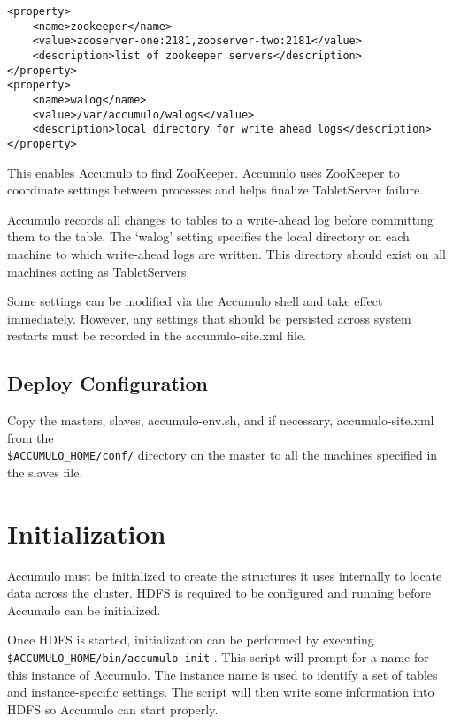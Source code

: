 \small
\begin{verbatim}
<property>
    <name>zookeeper</name>
    <value>zooserver-one:2181,zooserver-two:2181</value>
    <description>list of zookeeper servers</description>
</property>
<property>
    <name>walog</name>
    <value>/var/accumulo/walogs</value>
    <description>local directory for write ahead logs</description>
</property>
\end{verbatim}
\normalsize

This enables Accumulo to find ZooKeeper. Accumulo uses ZooKeeper to coordinate
settings between processes and helps finalize TabletServer failure.

Accumulo records all changes to tables to a write-ahead log before committing
them to the table. The `walog' setting specifies the local directory on each machine
to which write-ahead logs are written. This directory should exist on all machines
acting as TabletServers.

Some settings can be modified via the Accumulo shell and take effect immediately.
However, any settings that should be persisted across system restarts must be
recorded in the accumulo-site.xml file.

\subsection{Deploy Configuration}

Copy the masters, slaves, accumulo-env.sh, and if necessary, accumulo-site.xml
from the\\\texttt{\$ACCUMULO\_HOME/conf/} directory on the master to all the machines
specified in the slaves file.

\section{Initialization}

Accumulo must be initialized to create the structures it uses internally to locate
data across the cluster. HDFS is required to be configured and running before
Accumulo can be initialized.

Once HDFS is started, initialization can be performed by executing\\
\texttt{\$ACCUMULO\_HOME/bin/accumulo init} . This script will prompt for a name
for this instance of Accumulo. The instance name is used to identify a set of tables
and instance-specific settings. The script will then write some information into
HDFS so Accumulo can start properly.


